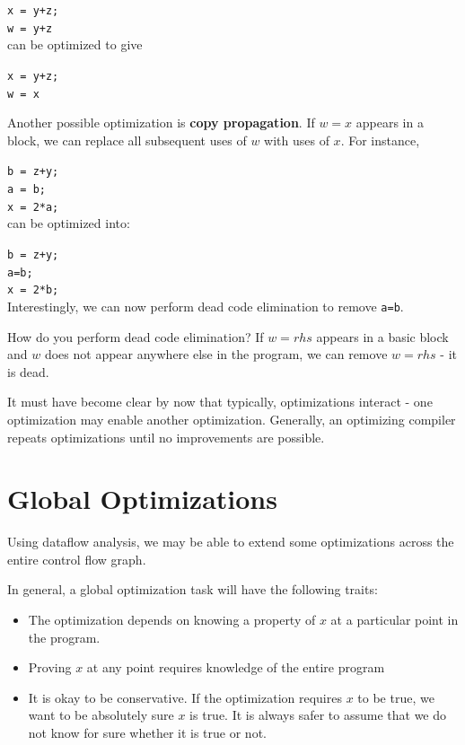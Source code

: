 \documentclass[12pt,letterpaper]{book}
\theoremstyle{definition}
\begin{document}
\texttt{x = y+z;}\\
\texttt{w = y+z} \\
can be optimized to give

\texttt{x = y+z;} \\
\texttt{w = x}

Another possible optimization is \textbf{copy propagation}. If $w = x$ appears in a block, we can replace all subsequent uses of $w$ with uses of $x$. For instance, 

\texttt{b = z+y;}\\
\texttt{a = b;}\\
\texttt{x = 2*a;}\\
can be optimized into:

\texttt{b = z+y;}\\
\texttt{a=b;}\\
\texttt{x = 2*b;}\\
Interestingly, we can now perform dead code elimination to remove \texttt{a=b}.

How do you perform dead code elimination? If $w = rhs$ appears in a basic block and $w$ does not appear anywhere else in the program, we can remove $w=rhs$ - it is dead.

It must have become clear by now that typically, optimizations interact - one optimization may enable another optimization. Generally, an optimizing compiler repeats optimizations until no improvements are possible.

\section{Global Optimizations}

Using dataflow analysis, we may be able to extend some optimizations across the entire control flow graph.

In general, a global optimization task will have the following traits:
\begin{itemize}
  \item The optimization depends on knowing a property of $x$ at a particular point in the program.
  \item Proving $x$ at any point requires knowledge of the entire program
  \item It is okay to be conservative. If the optimization requires $x$ to be true, we want to be absolutely sure $x$ is true. It is always safer to assume that we do not know for sure whether it is true or not.
\end{itemize}
\end{document}
